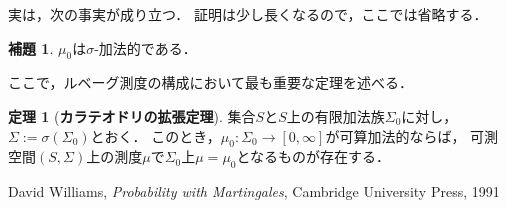 \documentclass{jsreport}
\theoremstyle{definition}
\newtheorem{lem}[defi]{補題}
\newtheorem{thm}[defi]{定理}
\begin{document}
実は，次の事実が成り立つ．
証明は少し長くなるので，ここでは省略する．

\begin{lem}\label{lem_mu_0_is_countably_additive}
$\mu_0$は$\sigma$-加法的である．
\end{lem}

ここで，ルベーグ測度の構成において最も重要な定理を述べる．

\begin{thm}[\textbf{カラテオドリの拡張定理}]\label{Caratheodorys_extension_theorem}
集合$S$と$S$上の有限加法族$\Sigma_0$に対し，$\Sigma:=\sigma(\Sigma_0)$とおく．
このとき，$\mu_0\colon\Sigma_0\to[0,\infty]$が可算加法的ならば，
可測空間$(S,\Sigma)$上の測度$\mu$で$\Sigma_0$上$\mu=\mu_0$となるものが存在する．
\end{thm}



\begin{thebibliography}{9}
\item David Williams, \textit{Probability with Martingales}, Cambridge University Press, 1991
\end{thebibliography}
\end{document}
